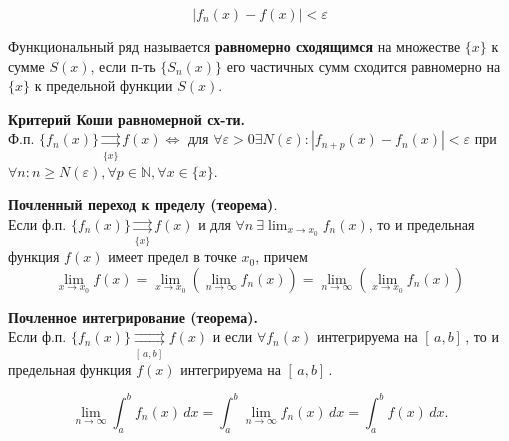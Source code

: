 \begin{equation}
    |f_n(x) - f(x)| < \varepsilon
\end{equation}

\bigbreak
Функциональный ряд называется \textbf{равномерно сходящимся} на множестве $\{x\}$ к сумме $S(x)$, если п-ть $\{S_n(x)\}$ его частичных сумм сходится равномерно на $\{x\}$ к предельной функции $S(x)$.

\bigbreak
\textbf{Критерий Коши равномерной сх-ти.} \\
Ф.п. $\{f_n(x)\}\underset{\{x\}}{\rightrightarrows}f(x) \Leftrightarrow $ для $\forall \varepsilon > 0 \exists N(\varepsilon): |f_{n+p}(x) - f_n(x)| < \varepsilon$ при $\forall n: n \ge N(\varepsilon), \forall p \in \mathbb{N}, \forall x \in \{x\}$.

\bigbreak
\textbf{Почленный переход к пределу (теорема)}. \\
Если ф.п. $\{f_n(x)\} \underset{\{x\}}{\rightrightarrows}f(x)$ и для $\forall n \ \exists \lim_{x \rightarrow x_0}{f_n(x)} $, то и предельная функция $f(x)$ имеет предел в точке $x_0$, причем
\begin{equation}
    \lim_{x \rightarrow x_0}{f(x)} = \lim_{x \rightarrow x_0}{(\lim_{n \rightarrow \infty}{f_n(x)})} = \lim_{n \rightarrow \infty}{(\lim_{x \rightarrow x_0}{f_n(x)})}
\end{equation}


\bigbreak
\textbf{Почленное интегрирование (теорема).} \\
Если ф.п. $\{f_n(x)\} \underset{[\,a,b]\, }{\rightrightarrows}f(x)$ и если $\forall f_n(x)$ интегрируема на $[\,a,b]\,$, то и предельная функция $f(x)$ интегрируема на $[\,a,b]\,$.

\begin{equation}
    \lim_{n \rightarrow \infty}{\int_{a}^{b} f_n(x) \,dx} =  \int_{a}^{b} \lim_{n \rightarrow \infty}{f_n(x)} \,dx = \int_{a}^{b} f(x) \,dx.
\end{equation}

